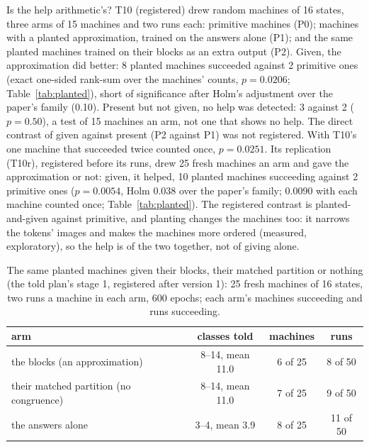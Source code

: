 \documentclass[11pt]{article}
\newcommand{\pn}[2]{#2}
\begin{document}
Is the help arithmetic's? T10 (registered) drew random machines of 16 states, three arms of
\pn{t10.machines}{15} machines and two runs each: primitive machines (P0); machines with a planted
approximation, trained on the answers alone (P1); and the same planted machines trained on their
blocks as an extra output (P2). Given, the approximation did better: \pn{t10.p2-machines}{8} planted
machines succeeded against \pn{t10.p0-machines}{2} primitive ones (exact one-sided rank-sum over the
machines' counts, $p = \pn{t10.b-p}{0.0206}$; Table~\ref{tab:planted}), short of significance after
Holm's adjustment over the paper's family (\pn{t10.b-holm}{0.10}). Present but not given, no help was detected: \pn{t10.p1-machines}{3} against
\pn{t10.p0-machines}{2} ($p = \pn{t10.a-p}{0.50}$), a test of 15 machines an arm, not one that
shows no help. The direct contrast of given against present (P2 against P1) was not registered. With T10's one machine that succeeded twice
counted once, $p = \pn{t10.b-once-p}{0.0251}$. Its replication (T10r), registered before its runs,
drew \pn{t10r.machines}{25} fresh machines an arm and gave the approximation or not: given, it
helped, \pn{t10r.p2-machines}{10} planted machines succeeding against \pn{t10r.p0-machines}{2}
primitive ones ($p = \pn{t10r.p}{0.0054}$, Holm \pn{family.t10r}{0.038} over the paper's family;
\pn{t10r.once-p}{0.0090} with each machine counted once; Table~\ref{tab:planted}). The registered
contrast is planted-and-given against primitive, and planting changes the machines too: it narrows
the tokens' images and makes the machines more ordered (measured, exploratory), so the help is of the
two together, not of giving alone.

\begin{table}[t]
\centering
\caption{The same planted machines given their blocks, their matched partition or nothing (the told
plan's stage 1, registered after version 1): 25 fresh machines of 16 states, two runs a machine in
each arm, 600 epochs; each arm's machines succeeding and runs succeeding.}
\label{tab:told-planted}
\begin{tabular}{lccc}
\toprule
arm & classes told & machines & runs \\
\midrule
the blocks (an approximation) & 8--14, mean 11.0 & 6 of 25 & 8 of 50 \\
their matched partition (no congruence) & 8--14, mean 11.0 & 7 of 25 & 9 of 50 \\
the answers alone & 3--4, mean 3.9 & 8 of 25 & 11 of 50 \\
\bottomrule
\end{tabular}
\end{table}
\end{document}
